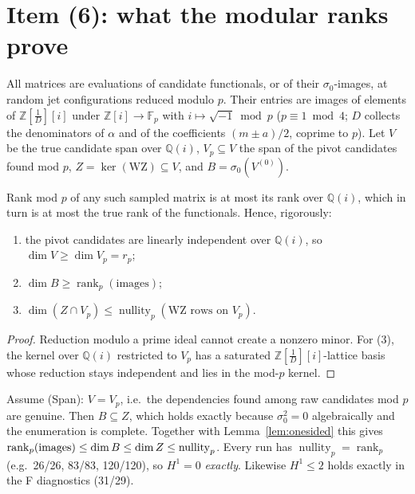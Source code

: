 \section{Item (6): what the modular ranks prove}\label{sec:rank}
All matrices are evaluations of candidate functionals, or of their $\sigma_0$-images, at random jet configurations reduced modulo $p$. Their entries are images of elements of $\mathbb Z[\tfrac1D][i]$ under $\mathbb Z[i]\to\mathbb F_p$ with $i\mapsto\sqrt{-1}\bmod p$ ($p\equiv1\bmod4$; $D$ collects the denominators of $\alpha$ and of the coefficients $(m\pm a)/2$, coprime to $p$). Let $V$ be the true candidate span over $\mathbb Q(i)$, $V_p\subseteq V$ the span of the pivot candidates found mod $p$, $Z=\ker(\text{WZ})\subseteq V$, and $B=\sigma_0(V^{(0)})$.
\begin{lemma}\label{lem:onesided}
Rank mod $p$ of any such sampled matrix is at most its rank over $\mathbb Q(i)$, which in turn is at most the true rank of the functionals. Hence, rigorously:
\begin{enumerate}
\item the pivot candidates are linearly independent over $\mathbb Q(i)$, so $\dim V\ge\dim V_p=r_p$;
\item $\dim B\ge\operatorname{rank}_p(\text{images})$;
\item $\dim(Z\cap V_p)\le\operatorname{nullity}_p(\text{WZ rows on }V_p)$.
\end{enumerate}
\end{lemma}
\begin{proof}
Reduction modulo a prime ideal cannot create a nonzero minor. For (3), the kernel over $\mathbb Q(i)$ restricted to $V_p$ has a saturated $\mathbb Z[\frac1D][i]$-lattice basis whose reduction stays independent and lies in the mod-$p$ kernel.
\end{proof}
\begin{corollary}[rigorous form of every ``$H^1=0$'' in v1--v3]
Assume (Span): $V=V_p$, i.e.\ the dependencies found among raw candidates mod $p$ are genuine. Then $B\subseteq Z$, which holds exactly because $\sigma_0^2=0$ algebraically and the enumeration is complete. Together with Lemma~\ref{lem:onesided} this gives $\operatorname{rank}_p({\rm images})\le\dim B\le\dim Z\le\operatorname{nullity}_p$. Every run has $\operatorname{nullity}_p=\operatorname{rank}_p$ (e.g.\ 26/26, 83/83, 120/120), so $H^1=0$ \emph{exactly}. Likewise $H^1\le2$ holds exactly in the F diagnostics (31/29).
\end{corollary}
